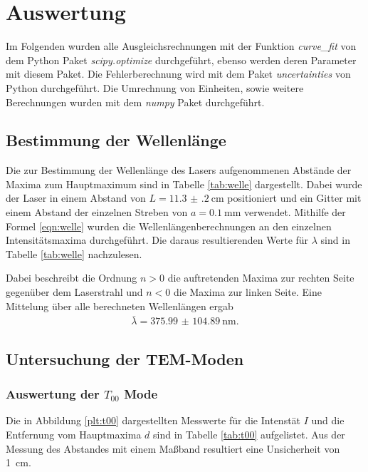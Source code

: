 \newpage
\section{Auswertung}

\label{sec:Auswertung}
Im Folgenden wurden alle Ausgleichsrechnungen mit der Funktion \textit{curve\_fit} von dem
Python Paket \textit{scipy.optimize} \cite{scipy} durchgeführt, ebenso werden deren
Parameter mit diesem Paket. Die Fehlerberechnung wird mit dem Paket \textit{uncertainties}
\cite{uncertainties} von Python durchgeführt. Die Umrechnung von
Einheiten, sowie weitere Berechnungen wurden mit dem \textit{numpy} Paket \cite{numpy}
durchgeführt.

\subsection{Bestimmung der Wellenlänge}
Die zur Bestimmung der Wellenlänge des Lasers aufgenommenen Abstände der Maxima
zum Hauptmaximum
sind in Tabelle \ref{tab:welle} dargestellt.
Dabei wurde der Laser in einem Abstand
von $L = \SI{11.3(2)}{\centi\meter}$ positioniert und ein Gitter mit einem
Abstand der einzelnen Streben von $a = \SI{0.1}{\milli\meter}$ verwendet.
Mithilfe der Formel \ref{eqn:welle} wurden die Wellenlängenberechnungen an den
einzelnen Intensitätsmaxima durchgeführt. Die daraus resultierenden Werte für
$\lambda$ sind in Tabelle \ref{tab:welle} nachzulesen.



Dabei beschreibt die Ordnung $n>0$ die auftretenden Maxima zur rechten Seite
gegenüber dem Laserstrahl und $n<0$ die Maxima zur linken Seite.
Eine Mittelung über alle berechneten Wellenlängen ergab
\begin{align*}
  \bar{\lambda} = \SI{375.99(10489)}{\nano\meter}.
\end{align*}


\subsection{Untersuchung der TEM-Moden}

\subsubsection{Auswertung der $T_{00}$ Mode}
Die in Abbildung \ref{plt:t00} dargestellten Messwerte für die Intenstät $I$
und die Entfernung vom Hauptmaxima $d$ sind in Tabelle \ref{tab:t00}
aufgelistet. Aus der Messung des Abstandes mit einem Maßband resultiert eine
Unsicherheit von \SI{1}{\centi\meter}.

